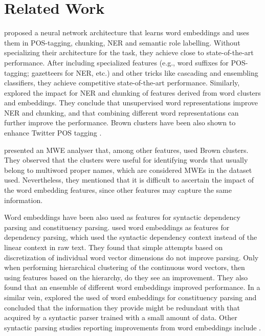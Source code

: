 \section{Related Work}

 proposed a neural network architecture
that learns word embeddings and uses them in POS-tagging, chunking, NER and semantic role labelling. 
Without specializing their architecture for the task, they achieve close to state-of-the-art performance. After including specialized features (e.g., word suffixes for POS-tagging;  gazetteers for NER, etc.) and other tricks like cascading and ensembling classifiers, they achieve competitive state-of-the-art performance.
Similarly,  explored the impact for NER and chunking 
of %
features derived from word clusters and embeddings. 
They conclude that unsupervised word representations improve NER and chunking, and that combining different word representations can further improve the performance.
Brown clusters have been also shown to enhance
Twitter POS tagging . 

 presented an MWE analyser that, among other features, used Brown clusters. 
They observed that the clusters were useful for identifying words that usually belong to multiword proper names, which are considered MWEs in the dataset used. Nevertheless, they mentioned that it is difficult to ascertain the impact of the word embedding features, since other features may capture the same information. 

Word embeddings have been also used as features for syntactic dependency parsing and constituency parsing. 
 used word embeddings as features for dependency parsing, which used the syntactic dependency context instead of the linear context in raw text. They found that simple attempts based on discretization of individual word vector dimensions do not improve parsing. Only when performing hierarchical clustering of the continuous word vectors, then using features based on the hierarchy, do they see an improvement. They also found that an ensemble of different word embeddings improved performance.
In a similar vein,  explored the used of word embeddings for constituency parsing and concluded that the
information they provide might be redundant with that acquired by a syntactic parser trained with a small amount of data. Other syntactic parsing studies reporting improvements from word embeddings include \cite{Koo:2008,Koo:2010,Haffari:2011,Tratz:2011}.

